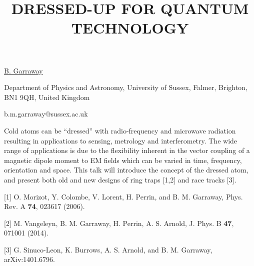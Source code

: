 \title{DRESSED-UP FOR QUANTUM TECHNOLOGY}

\underline{B. Garraway} 

{\normalsize{\vspace{-4mm}
Department of Physics and Astronomy, University of Sussex, Falmer,
Brighton, BN1 9QH, United Kingdom

\email b.m.garraway@sussex.ac.uk}}

Cold atoms can be ``dressed'' with radio-frequency and microwave radiation resulting in applications to sensing, metrology and interferometry. The wide range of applications is due to the flexibility inherent in the vector coupling of a magnetic dipole moment to EM fields which can be varied in time, frequency, orientation and space. This talk will introduce the concept of the dressed atom, and present both old and new designs of ring traps [1,2] and race tracks [3].

{\normalsize
[1] O. Morizot, Y. Colombe, V. Lorent, H. Perrin, and B. M. Garraway, Phys. Rev. A \textbf{74}, 023617 (2006).
\vsp

[2] M. Vangeleyn, B. M. Garraway, H. Perrin, A. S. Arnold, J. Phys. B \textbf{47}, 071001 (2014).
\vsp

[3] G. Sinuco-Leon, K. Burrows, A. S. Arnold, and B. M. Garraway, arXiv:1401.6796.
}

\vspace{\baselineskip}
